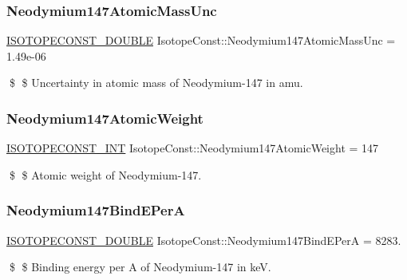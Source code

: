 \subsubsection{\texorpdfstring{Neodymium147\+Atomic\+Mass\+Unc}{Neodymium147AtomicMassUnc}}
{\footnotesize\ttfamily \mbox{\hyperlink{group___isotope_const-_macros_ga8f45a7272ce02c0b4c65c44636ed719a}{I\+S\+O\+T\+O\+P\+E\+C\+O\+N\+S\+T\+\_\+\+D\+O\+U\+B\+LE}} Isotope\+Const\+::\+Neodymium147\+Atomic\+Mass\+Unc = 1.\+49e-\/06}

\$ \$ Uncertainty in atomic mass of Neodymium-\/147 in amu. \mbox{\label{group___isotope_const-_neodymium-_nd147_ga97e91c0242c70b636886d1299bbb5397}} 
\subsubsection{\texorpdfstring{Neodymium147\+Atomic\+Weight}{Neodymium147AtomicWeight}}
{\footnotesize\ttfamily \mbox{\hyperlink{group___isotope_const-_macros_ga5f18360b3e99483a35c32d789e62621c}{I\+S\+O\+T\+O\+P\+E\+C\+O\+N\+S\+T\+\_\+\+I\+NT}} Isotope\+Const\+::\+Neodymium147\+Atomic\+Weight = 147}

\$ \$ Atomic weight of Neodymium-\/147. \mbox{\label{group___isotope_const-_neodymium-_nd147_ga75115b1115ef1a23ee1de409bbab4628}} 
\subsubsection{\texorpdfstring{Neodymium147\+Bind\+E\+PerA}{Neodymium147BindEPerA}}
{\footnotesize\ttfamily \mbox{\hyperlink{group___isotope_const-_macros_ga8f45a7272ce02c0b4c65c44636ed719a}{I\+S\+O\+T\+O\+P\+E\+C\+O\+N\+S\+T\+\_\+\+D\+O\+U\+B\+LE}} Isotope\+Const\+::\+Neodymium147\+Bind\+E\+PerA = 8283.}

\$ \$ Binding energy per A of Neodymium-\/147 in keV. \mbox{\label{group___isotope_const-_neodymium-_nd147_ga49a2f3bf29c74891c309f1550de5f925}} 

